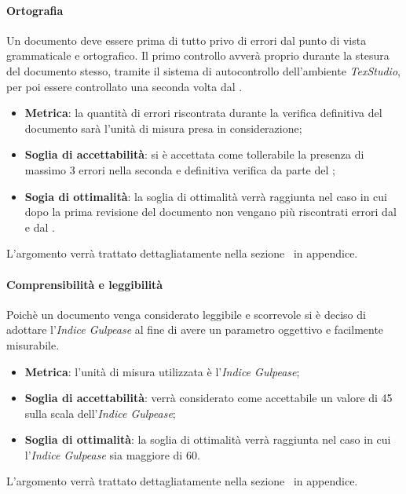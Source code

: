 \paragraph{Ortografia}
Un documento deve essere prima di tutto privo di errori dal punto di vista grammaticale e ortografico. 
Il primo controllo avverà proprio durante la stesura del documento stesso, tramite il sistema di autocontrollo dell'ambiente  \emph{TexStudio}, per poi essere controllato una seconda volta dal \ver{}.
\begin{itemize}
	\item \textbf{Metrica}: la quantità di errori riscontrata durante la verifica definitiva del documento sarà l'unità di misura presa in considerazione;
	\item \textbf{Soglia di accettabilità}: si è accettata come tollerabile la presenza di massimo 3 errori nella seconda e definitiva verifica da parte del \ver{};
	\item \textbf{Sogia di ottimalità}: la soglia di ottimalità verrà raggiunta nel caso in cui dopo la prima revisione del documento non vengano più riscontrati errori dal \ver{} e dal \RdP{}.
\end{itemize}
L'argomento verrà trattato dettagliatamente nella sezione~ in appendice.

\paragraph{Comprensibilità e leggibilità}
Poichè un documento venga considerato leggibile e scorrevole si è deciso di adottare l'\emph{Indice Gulpease} al fine di avere un parametro oggettivo e facilmente misurabile.
\begin{itemize}
	\item \textbf{Metrica}: l'unità di misura utilizzata è l'\emph{Indice Gulpease};
	\item \textbf{Soglia di accettabilità}: verrà considerato come accettabile un valore di 45 sulla scala dell'\emph{Indice Gulpease};
	\item \textbf{Soglia di ottimalità}: la soglia di ottimalità verrà raggiunta nel caso in cui l'\emph{Indice Gulpease} sia maggiore di 60.
\end{itemize}
L'argomento verrà trattato dettagliatamente nella sezione~ in appendice.

